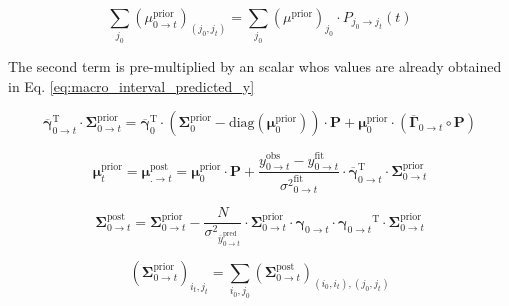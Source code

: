 \documentclass[pdflatex,sn-mathphys-num]{sn-jnl}%
\theoremstyle{thmstyleone}%
\theoremstyle{thmstyletwo}%
\theoremstyle{thmstylethree}%
\begin{document}
\begin{equation}
	\sum_{j_0} (\mu^{\mathrm{prior}}_{0 \rightarrow t})_{(j_0, j_{t})}= \sum_{j_0} (\mu^{\text{prior}})_{j_0} \cdot P_{j_0 \rightarrow j_t}(t)
	\label{eq:mu_prior_update_0_to_t}
\end{equation}

The second term is pre-multiplied by an scalar whos values are already obtained in Eq. \ref{eq:macro_interval_predicted_y}


\begin{equation}
	\overline{\boldsymbol{\gamma}}^{\mathrm{T}}_{0 \rightarrow t} \cdot \boldsymbol{\Sigma}^{\mathrm{prior}}_{0 \rightarrow t} = 
	\overline{\boldsymbol{\gamma}}_{0}^{\mathrm{T}} \cdot 
	\left( \boldsymbol{\Sigma}^{\mathrm{prior}}_{0} - \mathrm{diag}(\boldsymbol{\mu}^{\mathrm{prior}}_0) \right) \cdot \boldsymbol{P} 
	+ \boldsymbol{\mu}^{\mathrm{prior}}_0 \cdot \left( \overline{\boldsymbol{\Gamma}}_{0 \rightarrow t} \circ \boldsymbol{P} \right)
	\label{eq:gamma_sigma_prior_0t}
\end{equation}


\begin{equation}
	\boldsymbol{\mu}^{\mathrm{prior}}_{t} = \boldsymbol{\mu}^{\mathrm{post}}_{. \rightarrow t} = \boldsymbol{\mu}^{\mathrm{prior}}_0 \cdot \boldsymbol{P} + 
	\frac{y^{\mathrm{obs}}_{0 \rightarrow t} - y^{\mathrm{fit}}_{0 \rightarrow t}}{{\sigma^2}^{\mathrm{fit}}_{0 \rightarrow t}} 
	\cdot \overline{\boldsymbol{\gamma}}^{\mathrm{T}}_{0 \rightarrow t} \cdot \boldsymbol{\Sigma}^{\mathrm{prior}}_{0 \rightarrow t}
	\label{eq:posterior_mean_update_0t}
\end{equation}


\begin{equation}
	\boldsymbol{\Sigma}^{\mathrm{post}}_{0 \rightarrow t} = \boldsymbol{\Sigma}^{\mathrm{prior}}_{0 \rightarrow t} - 
	\frac{N}{{\sigma^2}_{\overline{y}^{\mathrm{pred}}_{0 \rightarrow t}}} \cdot \boldsymbol{\Sigma}^{\mathrm{prior}}_{0 \rightarrow t} \cdot \boldsymbol{\gamma}_{0 \rightarrow t} \cdot 
	{\boldsymbol{\gamma}_{0 \rightarrow t}}^{\mathrm{T}} \cdot \boldsymbol{\Sigma}^{\mathrm{prior}}_{0 \rightarrow t}
	\label{eq:posterior_covariance_update_0_t}
\end{equation}


\begin{equation}
	(\boldsymbol{\Sigma}^{\mathrm{prior}}_{0 \rightarrow t})_{i_{t}, j_{t}} = \sum_{i_{0}, j_{0}} (\boldsymbol{\Sigma}^{\mathrm{post}}_{0 \rightarrow t})_{(i_{0}, i_{t}), (j_{0}, j_{t})}
	\label{eq:prior_covariance_marginalization}
\end{equation}
\end{document}

